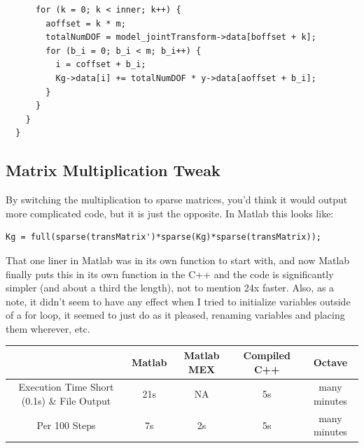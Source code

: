 \documentclass{article}
\begin{document}
\begin{verbatim}
      for (k = 0; k < inner; k++) {
        aoffset = k * m;
        totalNumDOF = model_jointTransform->data[boffset + k];
        for (b_i = 0; b_i < m; b_i++) {
          i = coffset + b_i;
          Kg->data[i] += totalNumDOF * y->data[aoffset + b_i];
        }
      }
    }
  }
\end{verbatim}

\subsection{Matrix Multiplication Tweak}

\noindent By switching the multiplication to sparse matrices, you'd think it would output more complicated code, but it is just the opposite.  In Matlab this looks like:

\begin{verbatim}
Kg = full(sparse(transMatrix')*sparse(Kg)*sparse(transMatrix));
\end{verbatim}

\noindent  That one liner in Matlab was in its own function to start with, and now Matlab finally puts this in its own function in the C++ and the code is significantly simpler (and about a third the length), not to mention 24x faster.  Also, as a note, it didn't seem to have any effect when I tried to initialize variables outside of a for loop, it seemed to just do as it pleased, renaming variables and placing them wherever, etc.


\begin{center}
\begin{tabular}{|c| c c c c|}
\hline 
& Matlab & Matlab MEX & Compiled C++ & Octave \\
\hline
Execution Time Short (0.1s) \& File Output & 21s & NA & 5s & many minutes \\
\hline
Per 100 Steps & 7s & 2s & 5s & many minutes \\
\hline

\end{tabular}
\end{center}
\end{document}
